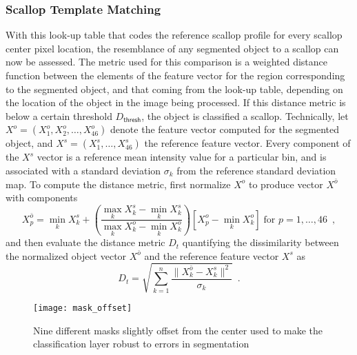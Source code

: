 \subsubsection{Scallop Template Matching} \label{subsubsec:scallop_template_matching}

With this look-up table that codes the reference scallop profile for every scallop center pixel location,
the resemblance of any segmented object to a scallop can now be assessed.
The metric used for this comparison is a weighted distance function between the 
elements of the feature vector for the region corresponding to the segmented object, and that coming from the look-up table, depending on the location of the object in the image being processed.
If this distance metric is below a certain threshold $D_\mathsf{thresh}$, the object is classified
a scallop.
Technically, let $X^o=(X^o_1,X^o_2, \ldots,X^o_{46})$ denote the feature vector computed for the segmented object,
and $X^s=(X^s_1,\ldots,X^s_{46})$ the reference
feature vector. 
Every component of the $X^s$ vector is a reference mean intensity value for a particular bin, and is associated with a standard deviation $\sigma_k$ from the reference standard deviation map.
To compute the distance metric, first normalize $X^o$ to produce vector $X^{\bar{o}}$ with components 
%
\[
X^{\bar{o}}_p = \min_{k} X^s_k + \left(\frac{\max \limits_{k} X^s_k-\min \limits_{k} X^s_k}{\max \limits_{k} X^o_k-\min \limits _{k} X^o_k}
\right)\left[ X^o_p-\min_{k} X^o_k \right] \;\text{for } p=1,\ldots,46\enspace,
\]
%
and then evaluate the distance metric $D_{t}$ quantifying the dissimilarity between the normalized object vector $X^{\bar{o}}$ and the reference feature vector $X^s$ as
%
\begin{equation}\label{distance}
D_{t} = \sqrt{\sum_{k=1}^n\frac{\|X^{\bar{o}}_{k}-X^s_k\|^2}{\sigma_k}} \enspace .
\end{equation}
%

%
\begin{figure}
\centering
\texttt{[image: mask\_offset]}
\caption[Template matching masks]{Nine different masks slightly offset from the center used to make the classification layer
robust to errors in segmentation}
\label{fig:scallop_masks}
\end{figure}
%

